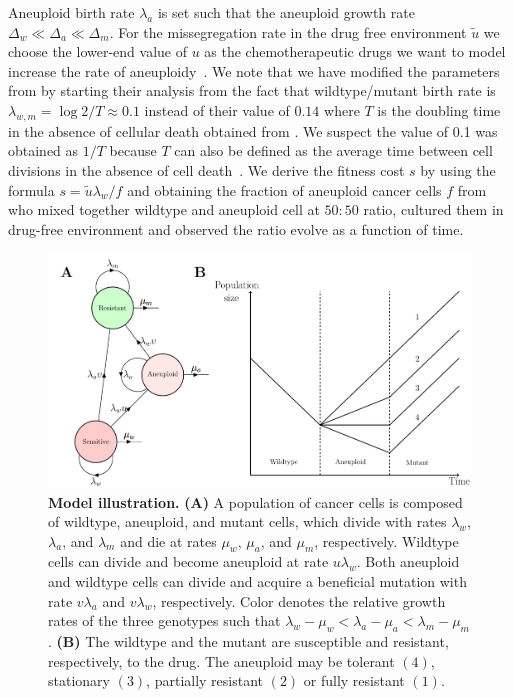 \documentclass[12pt]{extarticle}
\begin{document}
\begin{table}
\begin{center}
{Aneuploid birth rate $\lambda_a$ is set such that the aneuploid growth rate $\Delta_w\ll\Delta_a\ll\Delta_m$. For the missegregation rate in the drug free environment $\tilde{u}$ we choose the lower-end value of $u$ as the chemotherapeutic drugs we want to model increase the rate of aneuploidy~\citep{wang2019molecular,mason2017functional}. We note that we have modified the parameters from \citet{bozic2013evolutionary} by starting their analysis from the fact that wildtype/mutant birth rate is $\lambda_{w,m}=\log2/T\approx0.1$ instead of their value of $0.14$ where $T$ is the doubling time in the absence of cellular death obtained from \citet{rew2000cell}. We suspect the value of 0.1 was obtained as $1/T$ because $T$ can also be defined as the average time between cell divisions in the absence of cell death~\citet{avanzini2019cancer}. We derive the fitness cost $s$ by using the formula $s=\tilde{u}\lambda_w/f$ and obtaining the fraction of aneuploid cancer cells $f$ from \citep{lukow2021chromosomal} who mixed together wildtype and aneuploid cell at $50:50$ ratio, cultured them in drug-free environment and observed the ratio evolve as a function of time.}
  \label{table1}
\end{center}
\end{table}


\begin{figure}
\centering
\includegraphics[width=\textwidth]{Figures/figureAneuploidy.pdf}
\caption{
\textbf{Model illustration.}
\textbf{(A)} A population of cancer cells is composed of wildtype, aneuploid, and mutant cells, which divide with rates $\lambda_w$, $\lambda_a$, and $\lambda_m$ and die at rates $\mu_w$, $\mu_a$, and $\mu_m$, respectively. 
Wildtype cells can divide and become aneuploid at rate $u\lambda_w$. Both aneuploid and wildtype cells can divide and acquire a beneficial mutation with rate $v\lambda_a$ and $v\lambda_w$, respectively. Color denotes the relative growth rates of the three genotypes such that $\lambda_w - \mu_w < \lambda_a - \mu_a < \lambda_m - \mu_m$. \textbf{(B)} The wildtype and the mutant are susceptible and resistant, respectively, to the drug. The aneuploid may be tolerant $(4)$, stationary $(3)$, partially resistant $(2)$ or fully resistant $(1)$.
}
\label{figureAneuploidy}
\end{figure}
\end{document}
